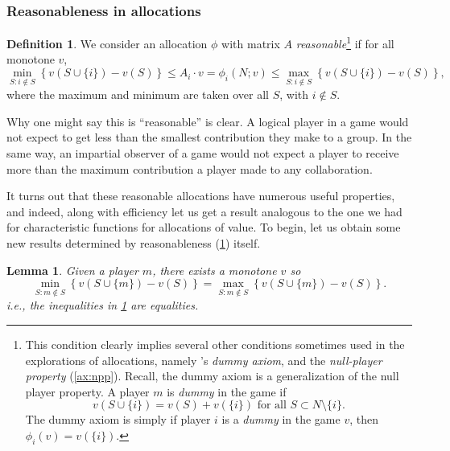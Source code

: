\documentclass[12pt,letterpaper,final]{article}
\theoremstyle{plain}
\theoremstyle{plain}
\theoremstyle{plain}
\newtheorem{lemma}[theorem]{Lemma}
\theoremstyle{plain}
\theoremstyle{plain}
\theoremstyle{plain}
\theoremstyle{plain}
\theoremstyle{definition}
\newtheorem{definition}{Definition}[section]
\theoremstyle{definition}
\theoremstyle{definition}
\theoremstyle{definition}
\theoremstyle{definition}
\theoremstyle{remark}
\theoremstyle{remark}
\theoremstyle{remark}
\theoremstyle{remark}
\begin{document}
\subsubsection{Reasonableness in allocations}

\begin{definition}\label{def:reasonable}
  We consider an allocation \(\phi\) with matrix \(A\)
  \emph{reasonable}\footnote{This 
    condition clearly implies several other conditions sometimes used
    in the explorations of allocations, namely \citeauthor{Weber78}'s
    \emph{dummy axiom}, and the \emph{null-player property}
    (\cref{ax:npp}). Recall, the dummy axiom is a
    generalization of the null player property.
    A player \(m\) is \emph{dummy} in the game if
    \[
      v(S\cup \{i\}) = v(S) + v(\{i\}) \text{ for all } S \subset
      N\setminus\{i\}.
    \]
    The dummy axiom is simply
    if player \(i\) is a \emph{dummy} in the game \(v\), then
    \(\phi_i(v)=v(\{i\})\).
  }
  if for all monotone \(v\),
  \begin{equation}\label{def:reasonablebounds}
    \min_{S: i\notin S}\left\{ v\left(S \cup\{i\}\right) -v(S)\right\}
    \leq A_i\cdot v = \phi_i(N;v) \leq \max_{S: i \notin
      S}\left\{v\left(S \cup \{i\}\right) - v(S)\right\},   
  \end{equation}
  where the maximum and minimum are taken over all \(S\), with \(i\notin S\).  
\end{definition}

Why one might say this is ``reasonable'' is clear. A logical player
in a game would not expect to get less than the smallest contribution
they make to a group. In the same way, an impartial observer of a game
would not expect a player to receive more than the maximum
contribution a player made to any collaboration.

It turns out that these reasonable allocations have numerous useful properties, and
indeed, along with efficiency let us get a result analogous to the one we had for
characteristic functions for allocations of value.
To begin, let us obtain some new results determined by reasonableness
(\cref{def:reasonable}) itself.

\begin{lemma}\label{lem:maxplayergains}
  Given a player \(m\), there exists a monotone \(v\) so
  \[
    \min_{S:m \notin S}\left\{ v\left(S\cup\{m\}\right) - v(S)\right\} =
    \max_{S:m\notin S}\left\{v\left(S \cup \{m\}\right) - v(S)\right\}.    
  \]
  i.e., the inequalities in \cref{def:reasonable} are equalities.
\end{lemma}
\end{document}
